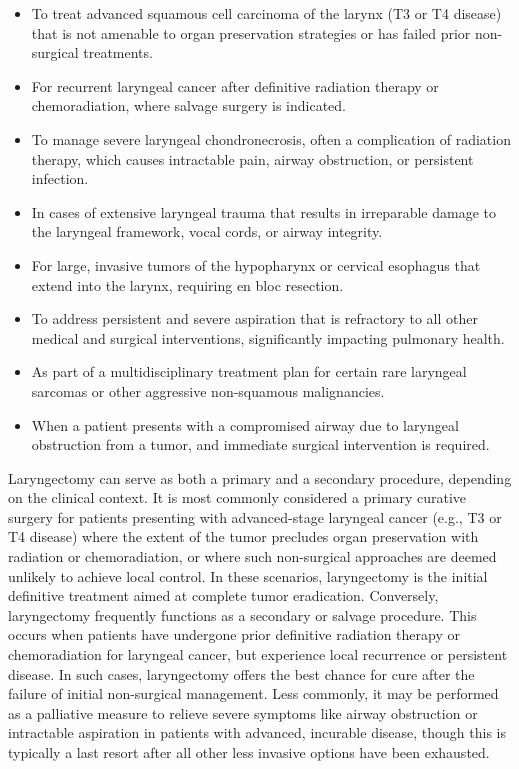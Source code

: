 \begin{itemize}
  \item To treat advanced squamous cell carcinoma of the larynx (T3 or T4 disease) that is not amenable to organ preservation strategies or has failed prior non-surgical treatments.
  \item For recurrent laryngeal cancer after definitive radiation therapy or chemoradiation, where salvage surgery is indicated.
  \item To manage severe laryngeal chondronecrosis, often a complication of radiation therapy, which causes intractable pain, airway obstruction, or persistent infection.
  \item In cases of extensive laryngeal trauma that results in irreparable damage to the laryngeal framework, vocal cords, or airway integrity.
  \item For large, invasive tumors of the hypopharynx or cervical esophagus that extend into the larynx, requiring en bloc resection.
  \item To address persistent and severe aspiration that is refractory to all other medical and surgical interventions, significantly impacting pulmonary health.
  \item As part of a multidisciplinary treatment plan for certain rare laryngeal sarcomas or other aggressive non-squamous malignancies.
  \item When a patient presents with a compromised airway due to laryngeal obstruction from a tumor, and immediate surgical intervention is required.
\end{itemize}

Laryngectomy can serve as both a primary and a secondary procedure, depending on the clinical context. It is most commonly considered a primary curative surgery for patients presenting with advanced-stage laryngeal cancer (e.g., T3 or T4 disease) where the extent of the tumor precludes organ preservation with radiation or chemoradiation, or where such non-surgical approaches are deemed unlikely to achieve local control. In these scenarios, laryngectomy is the initial definitive treatment aimed at complete tumor eradication. Conversely, laryngectomy frequently functions as a secondary or salvage procedure. This occurs when patients have undergone prior definitive radiation therapy or chemoradiation for laryngeal cancer, but experience local recurrence or persistent disease. In such cases, laryngectomy offers the best chance for cure after the failure of initial non-surgical management. Less commonly, it may be performed as a palliative measure to relieve severe symptoms like airway obstruction or intractable aspiration in patients with advanced, incurable disease, though this is typically a last resort after all other less invasive options have been exhausted.

